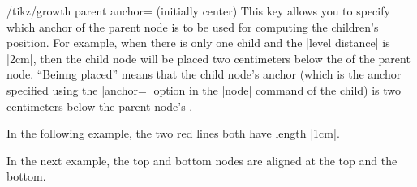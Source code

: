 \begin{key}{/tikz/growth parent anchor= (initially center)}
  This key allows you to specify which anchor of the parent node is
  to be used for computing the children's position. For example, when
  there is only one child and the |level distance| is |2cm|, then the
  child node will be placed two centimeters below the  of
  the parent node. ``Beinng placed'' means that the child node's
  anchor (which is the anchor specified using the |anchor=| option in
  the |node| command of the child) is two centimeters below the parent
  node's . 

  In the following example, the two red lines both have length |1cm|.
\begin{codeexample}[]
\end{codeexample}

  In the next example, the top and bottom nodes are aligned at the top
  and the bottom.
\begin{codeexample}[]
\end{codeexample}
\end{key}

